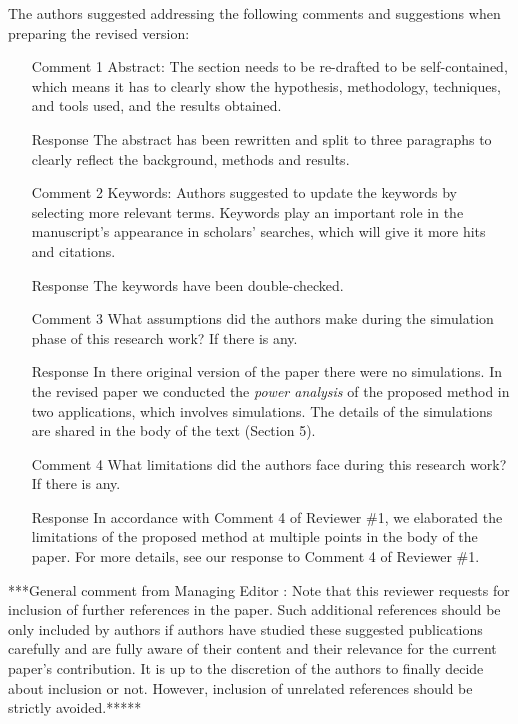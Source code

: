 \documentclass{article}
\begin{document}
The authors suggested addressing the following comments and suggestions when preparing the revised version:
\begin{itemize}
\item [Comment 1] Abstract: The section needs to be re-drafted to be self-contained, which means it has to clearly show the hypothesis, methodology, techniques, and tools used, and the results obtained.
\item [Response] The abstract has been rewritten and split to three paragraphs to clearly reflect the background, methods and results.
\item [Comment 2] Keywords: Authors suggested to update the keywords by selecting more relevant terms. Keywords play an important role in the manuscript's appearance in scholars' searches, which will give it more hits and citations.
\item [Response] The keywords have been double-checked.
\item [Comment 3] What assumptions did the authors make during the simulation phase of this research work? If there is any.
\item [Response] In there original version of the paper there were no simulations. In the revised paper we conducted the \emph{power analysis} of the proposed method in two applications, which involves simulations. The details of the simulations are shared in the body of the text (Section 5).
\item [Comment 4] What limitations did the authors face during this research work? If there is any.
\item [Response] In accordance with Comment 4 of Reviewer \#1, we elaborated the limitations of the proposed method at multiple points in the body of the paper. For more details, see our response to Comment 4 of Reviewer \#1.
\end{itemize}

\noindent ****General comment from Managing Editor : Note that this reviewer requests for inclusion of further references in the paper. Such additional references should be only included by authors if authors have studied these suggested publications carefully and are fully aware of their content and their relevance for the current paper's contribution. It is up to the discretion of the authors to finally decide about inclusion or not. However, inclusion of unrelated references should be strictly avoided.*****
\end{document}
